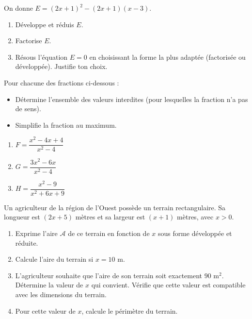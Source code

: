 \documentclass[11pt]{article}
\newcounter{popsec}
\newcounter{popsub}
\newcommand{\courssub}[1]{%
  \stepcounter{popsub}%
  \par\vspace{9pt}\noindent{\popxbold\fontsize{11.5}{13}\selectfont\color{popink}{\color{poporange}\thepopsec.\thepopsub}\hspace{6pt}#1}\par\nopagebreak\vspace{4pt}
}
\begin{document}
\begin{exercice}
On donne $E = (2x + 1)^2 - (2x + 1)(x - 3)$.
\begin{enumerate}
    \item Développe et réduis $E$.
    \item Factorise $E$.
    \item Résous l'équation $E = 0$ en choisissant la forme la plus adaptée (factorisée ou développée). Justifie ton choix.
\end{enumerate}
\end{exercice}

\begin{exercice}
Pour chacune des fractions ci-dessous :
\begin{itemize}
    \item Détermine l'ensemble des valeurs interdites (pour lesquelles la fraction n'a pas de sens).
    \item Simplifie la fraction au maximum.
\end{itemize}
\begin{enumerate}
    \item $F = \dfrac{x^2 - 4x + 4}{x^2 - 4}$
    \item $G = \dfrac{3x^2 - 6x}{x^2 - 4}$
    \item $H = \dfrac{x^2 - 9}{x^2 + 6x + 9}$
\end{enumerate}
\end{exercice}

\courssub{Je me prépare au BEPC}

\begin{exercice}
Un agriculteur de la région de l'Ouest possède un terrain rectangulaire. Sa longueur est $(2x + 5)$ mètres et sa largeur est $(x + 1)$ mètres, avec $x > 0$.
\begin{enumerate}
    \item Exprime l'aire $\mathcal{A}$ de ce terrain en fonction de $x$ sous forme développée et réduite.
    \item Calcule l'aire du terrain si $x = 10$ m.
    \item L'agriculteur souhaite que l'aire de son terrain soit exactement $90 \text{ m}^2$. Détermine la valeur de $x$ qui convient. Vérifie que cette valeur est compatible avec les dimensions du terrain.
    \item Pour cette valeur de $x$, calcule le périmètre du terrain.
\end{enumerate}
\end{exercice}
\end{document}
